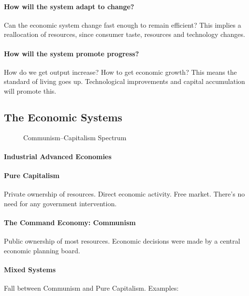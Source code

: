 \paragraph{How will the system adapt to change?} Can the economic system change fast enough to remain efficient? This implies a reallocation of resources, since consumer taste, resources and technology changes.

\paragraph{How will the system promote progress?} How do we get output increase? How to get economic growth? This means the standard of living goes up. Technological improvements and capital accumulation will promote this.

\subsection{The Economic Systems}

\begin{figure}[ht]
    \centering
    \caption{Communism--Capitalism Spectrum}
    \label{fig:communism-capitalism-spectrum}
\end{figure}

\paragraph{Industrial Advanced Economies}

\paragraph{Pure Capitalism} Private ownership of resources. Direct economic activity. Free market. There's no need for any government intervention.

\paragraph{The Command Economy: Communism} Public ownership of most resources. Economic decisions were made by a central economic planning board. 

\paragraph{Mixed Systems} Fall between Communism and Pure Capitalism. Examples:

